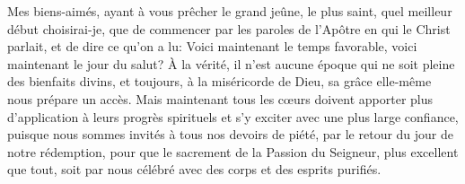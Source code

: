 Mes biens-aimés, ayant à vous prêcher le grand jeûne, le plus saint,
	quel meilleur début choisirai-je,
	que de commencer par les paroles de l’Apôtre en qui le Christ parlait,
	et de dire ce qu’on a lu:
	Voici maintenant le temps favorable, voici maintenant le jour du salut?
À la vérité, il n’est aucune époque qui ne soit pleine des bienfaits divins,
	et toujours, à la miséricorde de Dieu,
	sa grâce elle-même nous prépare un accès.
Mais maintenant
		tous les cœurs doivent apporter
		plus d’application à leurs progrès spirituels
	et s’y exciter avec une plus large confiance,
	puisque nous sommes invités à tous nos devoirs de piété,
	par le retour du jour de notre rédemption,
	pour que le sacrement de la Passion du Seigneur, plus excellent que tout,
	soit par nous célébré avec des corps et des esprits purifiés.
